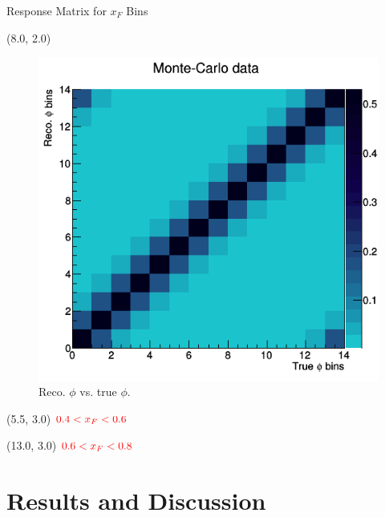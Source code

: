 \documentclass[10pt, xcolor={dvipsnames}, aspectratio = 169]{beamer}
\begin{document}
\begin{frame}{Response Matrix for $x_{F}$ Bins}
\begin{textblock}{7.0}(8.0, 2.0)
\begin{figure}
    \centering
    \includegraphics[width = 1.0\linewidth]{imgs/matrix_xf1.png}
    \caption{Reco. $\phi$ vs. true $\phi$.}
\end{figure}
\end{textblock}

\begin{textblock}{3.0}(5.5, 3.0)
$\color{red} 0.4 < x_{F} < 0.6$
\end{textblock}

\begin{textblock}{3.0}(13.0, 3.0)
$\color{red} 0.6 < x_{F} < 0.8$
\end{textblock}

\end{frame}

%
%
\section{Results and Discussion}

\end{document}
